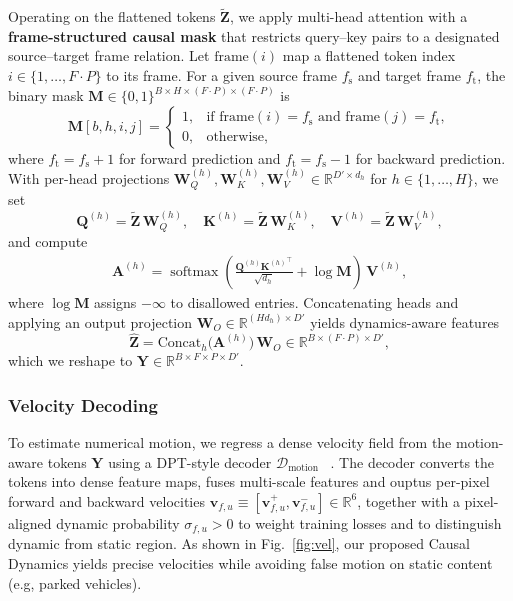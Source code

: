  Operating on the flattened tokens $\mathbf{\tilde{Z}}$, we apply multi-head attention with a \textbf{frame-structured causal mask} that restricts query–key pairs to a designated source--target frame relation. Let $\mathrm{frame}(i)$ map a flattened token index $i\in\{1,\dots,F\!\cdot\!P\}$ to its frame. For a given source frame $f_{\mathrm{s}}$ and target frame $f_{\mathrm{t}}$, the binary mask $\mathbf{M}\in\{0,1\}^{B\times H\times(F\cdot P)\times(F\cdot P)}$ is
\[
\mathbf{M}[b,h,i,j]=
\begin{cases}
1, & \text{if } \mathrm{frame}(i)=f_{\mathrm{s}} \text{ and } \mathrm{frame}(j)=f_{\mathrm{t}},\\
0, & \text{otherwise,}
\end{cases}
\]
where $f_{\mathrm{t}}=f_{\mathrm{s}}+1$ for forward prediction and $f_{\mathrm{t}}=f_{\mathrm{s}}-1$ for backward prediction. With per-head projections $\mathbf{W}^{(h)}_Q,\mathbf{W}^{(h)}_K,\mathbf{W}^{(h)}_V\in\mathbb{R}^{D'\times d_h}$ for $h\in\{1,\dots,H\}$, we set
\[
\mathbf{Q}^{(h)} = \mathbf{\tilde{Z}}\,\mathbf{W}^{(h)}_Q,\quad
\mathbf{K}^{(h)} = \mathbf{\tilde{Z}}\,\mathbf{W}^{(h)}_K,\quad
\mathbf{V}^{(h)} = \mathbf{\tilde{Z}}\,\mathbf{W}^{(h)}_V,
\]
and compute
\begin{align}
\mathbf{A}^{(h)} = \operatorname{softmax}\!\left(\frac{\mathbf{Q}^{(h)}{\mathbf{K}^{(h)}}^{\!\top}}{\sqrt{d_h}} + \log \mathbf{M}\right)\,\mathbf{V}^{(h)},
\label{eq:causal-attn-softmax}
\end{align}
where $\log \mathbf{M}$ assigns $-\infty$ to disallowed entries. Concatenating heads and applying an output projection $\mathbf{W}_O\in\mathbb{R}^{(H d_h)\times D'}$ yields dynamics-aware features
\[
\hat{\mathbf{Z}}=\mathrm{Concat}_h\big(\mathbf{A}^{(h)}\big)\,\mathbf{W}_O\in\mathbb{R}^{B\times(F\cdot P)\times D'},
\]
which we reshape to $\mathbf{Y}\in\mathbb{R}^{B\times F\times P\times D'}$. 


\subsubsection{Velocity Decoding}\label{sec:vel}  
To estimate numerical motion, we regress a dense velocity field from the motion-aware tokens $\mathbf{Y}$ using a DPT-style decoder $\mathcal{D}_{\text{motion}}$ ~\cite{dpt}. The decoder converts the tokens into dense feature maps, fuses multi-scale features and ouptus per-pixel forward and backward velocities $\mathbf{v}_{f,u} \equiv [\mathbf{v}^+_{f,u}, \mathbf{v}^-_{f,u}] \in\mathbb{R}^6$, together with a pixel-aligned dynamic probability $\sigma_{f,u}>0$ to weight training losses and to distinguish dynamic from static region. As shown in Fig.~\ref{fig:vel}, our proposed Causal Dynamics yields precise velocities while avoiding false motion on static content (e.g, parked vehicles). 

